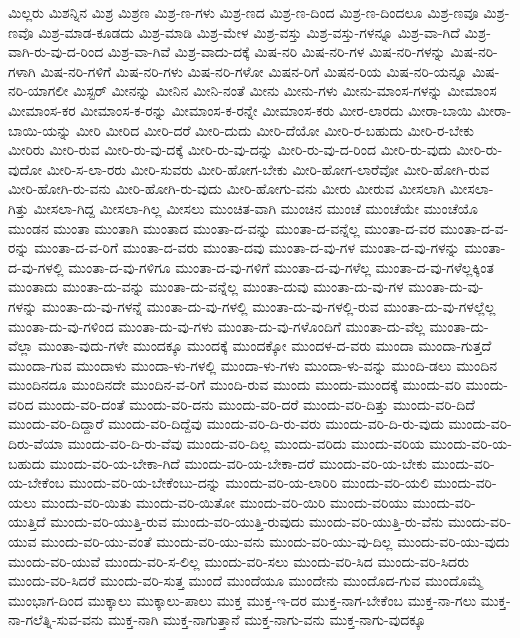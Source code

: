 {ಮಿಲ್ಲರು
ಮಿಶನ್ನಿನ
ಮಿಶ್ರ
ಮಿಶ್ರಣ
ಮಿಶ್ರ-ಣ-ಗಳು
ಮಿಶ್ರ-ಣದ
ಮಿಶ್ರ-ಣ-ದಿಂದ
ಮಿಶ್ರ-ಣ-ದಿಂದಲೂ
ಮಿಶ್ರ-ಣವೂ
ಮಿಶ್ರ-ಣವೊ
ಮಿಶ್ರ-ಮಾಡ-ಕೂಡದು
ಮಿಶ್ರ-ಮಾಡಿ
ಮಿಶ್ರ-ಮೇಳ
ಮಿಶ್ರ-ವಸ್ತು
ಮಿಶ್ರ-ವಸ್ತು-ಗಳನ್ನೂ
ಮಿಶ್ರ-ವಾ-ಗಿದೆ
ಮಿಶ್ರ-ವಾಗಿ-ರು-ವು-ದ-ರಿಂದ
ಮಿಶ್ರ-ವಾ-ಗಿವೆ
ಮಿಶ್ರ-ವಾದು-ದಕ್ಕೆ
ಮಿಷ-ನರಿ
ಮಿಷ-ನರಿ-ಗಳ
ಮಿಷ-ನರಿ-ಗಳನ್ನು
ಮಿಷ-ನರಿ-ಗಳಾಗಿ
ಮಿಷ-ನರಿ-ಗಳಿಗೆ
ಮಿಷ-ನರಿ-ಗಳು
ಮಿಷ-ನರಿ-ಗಳೋ
ಮಿಷನ-ರಿಗೆ
ಮಿಷನ-ರಿಯ
ಮಿಷ-ನರಿ-ಯನ್ನೂ
ಮಿಷ-ನರಿ-ಯಾಗಲೀ
ಮಿಸ್ಟರ್
ಮೀನನ್ನು
ಮೀನಿನ
ಮೀನಿ-ನಂತೆ
ಮೀನು
ಮೀನು-ಗಳು
ಮೀನು-ಮಾಂಸ-ಗಳನ್ನು
ಮೀಮಾಂಸ
ಮೀಮಾಂಸ-ಕರ
ಮೀಮಾಂಸ-ಕ-ರನ್ನು
ಮೀಮಾಂಸ-ಕ-ರನ್ನೇ
ಮೀಮಾಂಸ-ಕರು
ಮೀರ-ಲಾರದು
ಮೀರಾ-ಬಾಯಿ
ಮೀರಾ-ಬಾಯಿ-ಯನ್ನು
ಮೀರಿ
ಮೀರಿದ
ಮೀರಿ-ದರೆ
ಮೀರಿ-ದುದು
ಮೀರಿ-ದೆಯೋ
ಮೀರಿ-ರ-ಬಹುದು
ಮೀರಿ-ರ-ಬೇಕು
ಮೀರಿರು
ಮೀರಿ-ರುವ
ಮೀರಿ-ರು-ವು-ದಕ್ಕೆ
ಮೀರಿ-ರು-ವು-ದನ್ನು
ಮೀರಿ-ರು-ವು-ದ-ರಿಂದ
ಮೀರಿ-ರು-ವುದು
ಮೀರಿ-ರು-ವುದೋ
ಮೀರಿ-ಸ-ಲಾ-ರರು
ಮೀರಿ-ಸುವರು
ಮೀರಿ-ಹೋಗ-ಬೇಕು
ಮೀರಿ-ಹೋಗ-ಲಾರೆವೋ
ಮೀರಿ-ಹೋಗಿ-ರುವ
ಮೀರಿ-ಹೋಗಿ-ರು-ವನು
ಮೀರಿ-ಹೋಗಿ-ರು-ವುದು
ಮೀರಿ-ಹೋಗು-ವನು
ಮೀರು
ಮೀರುವ
ಮೀಸಲಾಗಿ
ಮೀಸಲಾ-ಗಿತ್ತು
ಮೀಸಲಾ-ಗಿದ್ದ
ಮೀಸಲಾ-ಗಿಲ್ಲ
ಮೀಸಲು
ಮುಂಚಿತ-ವಾಗಿ
ಮುಂಚಿನ
ಮುಂಚೆ
ಮುಂಚೆಯೇ
ಮುಂಚೆಯೊ
ಮುಂಡನ
ಮುಂತಾ
ಮುಂತಾಗಿ
ಮುಂತಾದ
ಮುಂತಾ-ದ-ವನ್ನು
ಮುಂತಾ-ದ-ವನ್ನೆಲ್ಲ
ಮುಂತಾ-ದ-ವರ
ಮುಂತಾ-ದ-ವ-ರನ್ನು
ಮುಂತಾ-ದ-ವ-ರಿಗೆ
ಮುಂತಾ-ದ-ವರು
ಮುಂತಾ-ದವು
ಮುಂತಾ-ದ-ವು-ಗಳ
ಮುಂತಾ-ದ-ವು-ಗಳನ್ನು
ಮುಂತಾ-ದ-ವು-ಗಳಲ್ಲಿ
ಮುಂತಾ-ದ-ವು-ಗಳಿಗೂ
ಮುಂತಾ-ದ-ವು-ಗಳಿಗೆ
ಮುಂತಾ-ದ-ವು-ಗಳೆಲ್ಲ
ಮುಂತಾ-ದ-ವು-ಗಳೆಲ್ಲಕ್ಕಿಂತ
ಮುಂತಾದು
ಮುಂತಾ-ದು-ವನ್ನು
ಮುಂತಾ-ದು-ವನ್ನೆಲ್ಲ
ಮುಂತಾ-ದುವು
ಮುಂತಾ-ದು-ವು-ಗಳ
ಮುಂತಾ-ದು-ವು-ಗಳನ್ನು
ಮುಂತಾ-ದು-ವು-ಗಳನ್ನೆ
ಮುಂತಾ-ದು-ವು-ಗಳಲ್ಲಿ
ಮುಂತಾ-ದು-ವು-ಗಳಲ್ಲಿ-ರುವ
ಮುಂತಾ-ದು-ವು-ಗಳಲ್ಲೆಲ್ಲ
ಮುಂತಾ-ದು-ವು-ಗಳಿಂದ
ಮುಂತಾ-ದು-ವು-ಗಳು
ಮುಂತಾ-ದು-ವು-ಗಳೊಂದಿಗೆ
ಮುಂತಾ-ದು-ವೆಲ್ಲ
ಮುಂತಾ-ದು-ವೆಲ್ಲಾ
ಮುಂತಾ-ವುದು-ಗಳೇ
ಮುಂದಕ್ಕೂ
ಮುಂದಕ್ಕೆ
ಮುಂದಕ್ಕೋ
ಮುಂದಳ-ದ-ವರು
ಮುಂದಾ
ಮುಂದಾ-ಗುತ್ತದೆ
ಮುಂದಾ-ಗುವ
ಮುಂದಾಳು
ಮುಂದಾ-ಳು-ಗಳಲ್ಲಿ
ಮುಂದಾ-ಳು-ಗಳು
ಮುಂದಾ-ಳು-ವನ್ನು
ಮುಂದಿ-ಡಲು
ಮುಂದಿನ
ಮುಂದಿನದೂ
ಮುಂದಿನದೇ
ಮುಂದಿನ-ವ-ರಿಗೆ
ಮುಂದಿ-ರುವ
ಮುಂದು
ಮುಂದು-ಮುಂದಕ್ಕೆ
ಮುಂದು-ವರಿ
ಮುಂದು-ವರಿದ
ಮುಂದು-ವರಿ-ದಂತೆ
ಮುಂದು-ವರಿ-ದನು
ಮುಂದು-ವರಿ-ದರೆ
ಮುಂದು-ವರಿ-ದಿತ್ತು
ಮುಂದು-ವರಿ-ದಿದೆ
ಮುಂದು-ವರಿ-ದಿದ್ದಾರೆ
ಮುಂದು-ವರಿ-ದಿದ್ದೆವು
ಮುಂದು-ವರಿ-ದಿ-ರು-ವರು
ಮುಂದು-ವರಿ-ದಿ-ರು-ವುದು
ಮುಂದು-ವರಿ-ದಿರು-ವೆಯಾ
ಮುಂದು-ವರಿ-ದಿ-ರು-ವೆವು
ಮುಂದು-ವರಿ-ದಿಲ್ಲ
ಮುಂದು-ವರಿದು
ಮುಂದು-ವರಿಯ
ಮುಂದು-ವರಿ-ಯ-ಬಹುದು
ಮುಂದು-ವರಿ-ಯ-ಬೇಕಾ-ಗಿದೆ
ಮುಂದು-ವರಿ-ಯ-ಬೇಕಾ-ದರೆ
ಮುಂದು-ವರಿ-ಯ-ಬೇಕು
ಮುಂದು-ವರಿ-ಯ-ಬೇಕೆಂಬ
ಮುಂದು-ವರಿ-ಯ-ಬೇಕೆಂಬು-ದನ್ನು
ಮುಂದು-ವರಿ-ಯ-ಲಾರಿರಿ
ಮುಂದು-ವರಿ-ಯಲಿ
ಮುಂದು-ವರಿ-ಯಲು
ಮುಂದು-ವರಿ-ಯಿತು
ಮುಂದು-ವರಿ-ಯಿತೋ
ಮುಂದು-ವರಿ-ಯಿರಿ
ಮುಂದು-ವರಿಯು
ಮುಂದು-ವರಿ-ಯುತ್ತಿದೆ
ಮುಂದು-ವರಿ-ಯುತ್ತಿ-ರುವ
ಮುಂದು-ವರಿ-ಯುತ್ತಿ-ರುವುದು
ಮುಂದು-ವರಿ-ಯುತ್ತಿ-ರು-ವೆನು
ಮುಂದು-ವರಿ-ಯುವ
ಮುಂದು-ವರಿ-ಯು-ವಂತೆ
ಮುಂದು-ವರಿ-ಯು-ವನು
ಮುಂದು-ವರಿ-ಯು-ವು-ದಿಲ್ಲ
ಮುಂದು-ವರಿ-ಯು-ವುದು
ಮುಂದು-ವರಿ-ಯುವೆ
ಮುಂದು-ವರಿ-ಸ-ಲಿಲ್ಲ
ಮುಂದು-ವರಿ-ಸಲು
ಮುಂದು-ವರಿ-ಸಿದ
ಮುಂದು-ವರಿ-ಸಿದರು
ಮುಂದು-ವರಿ-ಸಿದರೆ
ಮುಂದು-ವರಿ-ಸುತ್ತ
ಮುಂದೆ
ಮುಂದೆಯೂ
ಮುಂದೇನು
ಮುಂದೊದ-ಗುವ
ಮುಂದೊಮ್ಮೆ
ಮುಂಭಾಗ-ದಿಂದ
ಮುಕ್ಕಾಲು
ಮುಕ್ಕಾಲು-ಪಾಲು
ಮುಕ್ತ
ಮುಕ್ತ-ಇ-ದರ
ಮುಕ್ತ-ನಾಗ-ಬೇಕೆಂಬ
ಮುಕ್ತ-ನಾ-ಗಲು
ಮುಕ್ತ-ನಾ-ಗಲೆತ್ನಿ-ಸುವ-ವನು
ಮುಕ್ತ-ನಾಗಿ
ಮುಕ್ತ-ನಾಗುತ್ತಾನೆ
ಮುಕ್ತ-ನಾಗು-ವನು
ಮುಕ್ತ-ನಾಗು-ವುದಕ್ಕೂ
}
